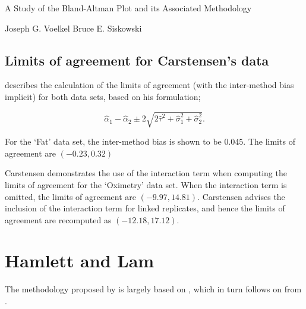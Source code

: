 \documentclass[12pt, a4paper]{report}
\begin{document}





A Study of the Bland-Altman Plot and its Associated Methodology

Joseph G. Voelkel Bruce E. Siskowski 



\subsection{Limits of agreement for Carstensen's data}


\citet{bxc2008} describes the calculation of the limits of agreement (with the inter-method bias implicit) for both data sets, based on his formulation;

\[\hat{\alpha}_1 - \hat{\alpha}_2 \pm 2\sqrt{2\hat{\tau}^2 +\hat{\sigma}_1^2 +\hat{\sigma}_2^2 }.\]

For the `Fat' data set, the inter-method bias is shown to be $0.045$. The limits of agreement are $(-0.23 , 0.32)$

Carstensen demonstrates the use of the interaction term when computing the limits of agreement for the `Oximetry' data set. When the interaction term is omitted, the limits of agreement are $(-9.97, 14.81)$. Carstensen advises the inclusion of the interaction term for linked replicates, and hence the limits of agreement are recomputed as $(-12.18,17.12)$.






\newpage
\section{Hamlett and Lam}
The methodology proposed by \citet{Roy2009} is largely based on \citet{hamlett}, which in turn follows on from \citet{lam}.
\end{document}
